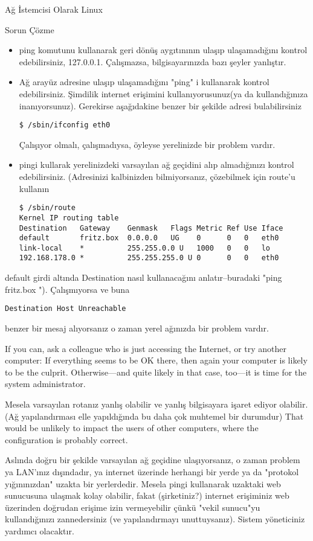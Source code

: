 \begin{section}{Ağ İstemcisi Olarak Linux}
\begin{subsection}{Sorun Çözme}
\begin{itemize}
\item ping komutunu kullanarak geri dönüş aygıtınının ulaşıp ulaşamadığını kontrol edebilirsiniz, 127.0.0.1. Çalışmazsa, bilgisayarınızda bazı şeyler yanlıştır.
\item Ağ arayüz adresine ulaşıp ulaşamadığını "ping" i kullanarak kontrol edebilirsiniz. Şimdilik internet erişimini kullanıyorusunuz(ya da kullandığınıza inanıyorsunuz). Gerekirse aşağıdakine benzer bir şekilde adresi bulabilirsiniz
\begin{verbatim}
$ /sbin/ifconfig eth0
\end{verbatim}
Çalışıyor olmalı, çalışmadıysa, öyleyse yerelinizde bir problem vardır.
\item pingi kullarak yerelinizdeki varsayılan ağ geçidini alıp almadığınızı kontrol edebilirsiniz. (Adresinizi kalbinizden bilmiyorsanız, çözebilmek için route'u kullanın
\begin{verbatim}
$ /sbin/route
Kernel IP routing table
Destination   Gateway    Genmask   Flags Metric Ref Use Iface
default       fritz.box  0.0.0.0   UG    0      0   0   eth0
link-local    *          255.255.0.0 U   1000   0   0   lo
192.168.178.0 *          255.255.255.0 U 0      0   0   eth0
\end{verbatim}
\end{itemize}
default girdi altında Destination nasıl kullanacağını anlatır--buradaki  "ping fritz.box "). Çalışmıyorsa ve buna 
\begin{verbatim}
Destination Host Unreachable
\end{verbatim}
benzer bir mesaj alıyorsanız o zaman yerel ağınızda bir problem vardır.

If you can, ask a colleague who is just accessing the Internet, or try another computer: If everything seems to be OK there, then again your computer is likely to be the culprit. Otherwise—and quite likely in that case, too—it is time for the system administrator.

Mesela varsayılan rotanız yanlış olabilir ve yanlış bilgisayara işaret ediyor olabilir. (Ağ yapılandırması elle yapıldığında bu daha çok muhtemel bir durumdur) That would be unlikely to impact the users of other computers, where the configuration is probably correct.

Aslında doğru bir şekilde varsayılan ağ geçidine ulaşıyorsanız, o zaman problem ya LAN'ınız dışındadır, ya internet üzerinde herhangi bir yerde ya da "protokol yığınınızdan" uzakta bir yerlerdedir. Mesela pingi kullanarak uzaktaki web sunucusuna ulaşmak kolay olabilir, fakat (şirketiniz?) internet erişiminiz web üzerinden doğrudan erişime izin vermeyebilir çünkü "vekil sunucu"yu kullandığınızı zannedersiniz (ve yapılandırmayı unuttuysanız). Sistem yöneticiniz yardımcı olacaktır. 


\end{subsection}
\end{section}

